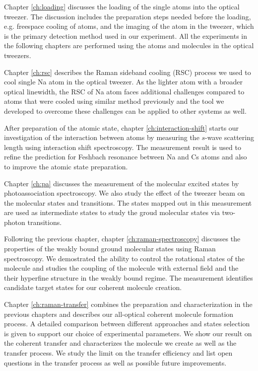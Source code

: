Chapter \ref{ch:loading} discusses the loading of the single atoms into the optical tweezer.
The discussion includes the preparation steps needed before the loading,
e.g. freespace cooling of atoms,
and the imaging of the atom in the tweezer,
which is the primary detection method used in our experiment.
All the experiments in the following chapters are performed using
the atoms and molecules in the optical tweezers.

Chapter \ref{ch:rsc} describes the Raman sideband cooling (RSC) process
we used to cool single Na atom in the optical tweezer.
As the lighter atom with a broader optical linewidth,
the RSC of Na atom faces additional challenges compared to atoms
that were cooled using similar method previously
and the tool we developed to overcome these challenges can be applied to other systems as well.

After preparation of the atomic state,
chapter \ref{ch:interaction-shift} starts our investigation of the interaction between atoms
by measuring the $s$-wave scattering length using interaction shift spectroscopy.
The measurement result is used to refine the prediction for Feshbach resonance
between Na and Cs atoms and also to improve the atomic state preparation.

Chapter \ref{ch:pa} discusses the measurement of the molecular excited states
by photoassociation spectroscopy.
We also study the effect of the tweezer beam on the molecular states and transitions.
The states mapped out in this measurement are used as intermediate states
to study the groud molecular states via two-photon transitions.

Following the previous chapter, chapter \ref{ch:raman-spectroscopy} discusses
the properties of the weakly bound ground molecular states using Raman spectroscopy.
We demostrated the ability to control the rotational states of the molecule
and studies the coupling of the molecule with external field
and the their hyperfine structure in the weakly bound regime.
The measurement identifies candidate target states for our coherent molecule creation.

Chapter \ref{ch:raman-transfer} combines the preparation and characterization
in the previous chapters and describes our all-optical coherent molecule formation process.
A detailed comparison between different approaches and states selection is given
to support our choice of experimental parameters.
We show our result on the coherent transfer and characterizes
the molecule we create as well as the transfer process.
We study the limit on the transfer efficiency
and list open questions in the transfer process
as well as possible future improvements.
